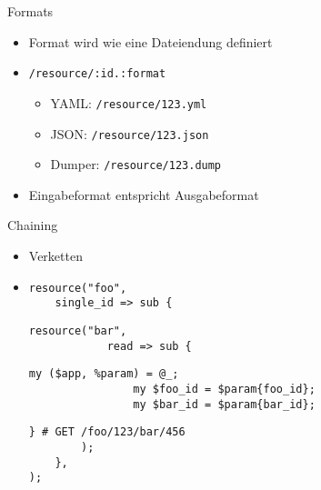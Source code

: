 
\begin{frame}{Formats}

    \begin{itemize}
        \item Format wird wie eine Dateiendung definiert
        \pause
        \item \texttt{/resource/:id.:format}
        \pause
        \begin{itemize}
            \item YAML: \texttt{/resource/123.yml}
            \pause
            \item JSON: \texttt{/resource/123.json}
            \pause
            \item Dumper: \texttt{/resource/123.dump}
            \pause
        \end{itemize}
        \item Eingabeformat entspricht Ausgabeformat
    \end{itemize}

\end{frame}


\begin{frame}[fragile]{Chaining}

\begin{itemize}
\item Verketten
\pause
\item[]
\begin{lstlisting}
resource("foo",
    single_id => sub {
\end{lstlisting}\pause\begin{lstlisting}[firstnumber=last]
        resource("bar",
            read => sub {
\end{lstlisting}\pause\begin{lstlisting}[firstnumber=last]
                my ($app, %param) = @_;
                my $foo_id = $param{foo_id};
                my $bar_id = $param{bar_id};
\end{lstlisting}\pause\begin{lstlisting}[firstnumber=last]
            } # GET /foo/123/bar/456
        );
    },
);
\end{lstlisting}
\end{itemize}
\end{frame}

